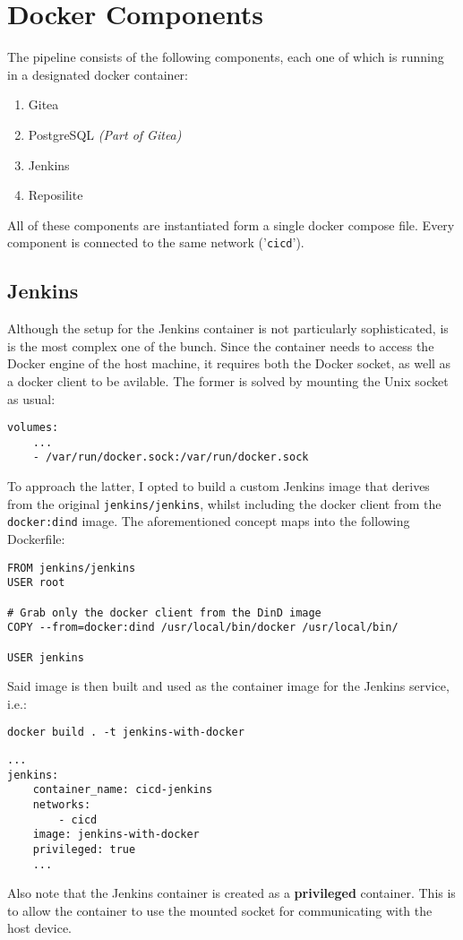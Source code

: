 \section{Docker Components}
The pipeline consists of the following components, each one of which is running in
a designated docker container:
\begin{enumerate}
	\item Gitea
	\item PostgreSQL \textit{(Part of Gitea)}
	\item Jenkins
	\item Reposilite
\end{enumerate}
All of these components are instantiated form a single docker compose file.
Every component is connected to the same network ('\verb|cicd|').
\subsection{Jenkins}
Although the setup for the Jenkins container is not particularly sophisticated,
is is the most complex one of the bunch.
Since the container needs to access the Docker engine of the host machine,
it requires both the Docker socket, as well as a docker client to be avilable.
The former is solved by mounting the Unix socket as usual:
\begin{lstlisting}
volumes:
    ...
    - /var/run/docker.sock:/var/run/docker.sock
\end{lstlisting}
To approach the latter, I opted to build a custom Jenkins image that derives from the
original \verb|jenkins/jenkins|, whilst including the docker client from the
\verb|docker:dind| image. The aforementioned concept maps into the following Dockerfile:
\begin{lstlisting}
FROM jenkins/jenkins
USER root

# Grab only the docker client from the DinD image
COPY --from=docker:dind /usr/local/bin/docker /usr/local/bin/

USER jenkins
\end{lstlisting}
Said image is then built and used as the container image for the Jenkins service, i.e.:
\begin{lstlisting}
docker build . -t jenkins-with-docker
\end{lstlisting}
\begin{lstlisting}
...
jenkins:
    container_name: cicd-jenkins
    networks:
        - cicd
    image: jenkins-with-docker
    privileged: true
    ...
\end{lstlisting}
Also note that the Jenkins container is created as a \textbf{privileged} container.
This is to allow the container to use the mounted socket for communicating with the
host device.

